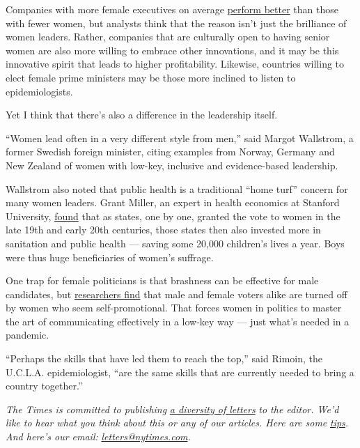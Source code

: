 Companies with more female executives on average
\href{https://www.nytimes.com/2013/10/24/opinion/kristof-twitter-women-power.html}{perform
better} than those with fewer women, but analysts think that the reason
isn't just the brilliance of women leaders. Rather, companies that are
culturally open to having senior women are also more willing to embrace
other innovations, and it may be this innovative spirit that leads to
higher profitability. Likewise, countries willing to elect female prime
ministers may be those more inclined to listen to epidemiologists.

Yet I think that there's also a difference in the leadership itself.

``Women lead often in a very different style from men,'' said Margot
Wallstrom, a former Swedish foreign minister, citing examples from
Norway, Germany and New Zealand of women with low-key, inclusive and
evidence-based leadership.

Wallstrom also noted that public health is a traditional ``home turf''
concern for many women leaders. Grant Miller, an expert in health
economics at Stanford University,
\href{https://fsi.stanford.edu/news/when-it-comes-health-men-have-long-benefited-women-power}{found}
that as states, one by one, granted the vote to women in the late 19th
and early 20th centuries, those states then also invested more in
sanitation and public health --- saving some 20,000 children's lives a
year. Boys were thus huge beneficiaries of women's suffrage.

One trap for female politicians is that brashness can be effective for
male candidates, but
\href{https://www.nytimes.com/2008/02/10/opinion/10kristof.html}{researchers
find} that male and female voters alike are turned off by women who seem
self-promotional. That forces women in politics to master the art of
communicating effectively in a low-key way --- just what's needed in a
pandemic.

``Perhaps the skills that have led them to reach the top,'' said Rimoin,
the U.C.L.A. epidemiologist, ``are the same skills that are currently
needed to bring a country together.''

\emph{The Times is committed to publishing}
\href{https://www.nytimes.com/2019/01/31/opinion/letters/letters-to-editor-new-york-times-women.html}{\emph{a
diversity of letters}} \emph{to the editor. We'd like to hear what you
think about this or any of our articles. Here are some}
\href{https://help.nytimes.com/hc/en-us/articles/115014925288-How-to-submit-a-letter-to-the-editor}{\emph{tips}}\emph{.
And here's our email:}
\href{mailto:letters@nytimes.com}{\emph{letters@nytimes.com}}\emph{.}

